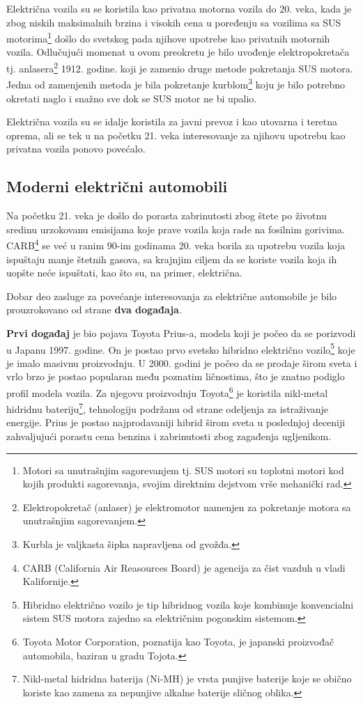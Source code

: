 \documentclass[a4paper]{article}
\begin{document}
Električna vozila su se koristila kao privatna motorna vozila do 20. veka, kada je zbog niskih maksimalnih brzina i visokih cena u poređenju sa vozilima sa SUS motorima\footnote{Motori sa unutrašnjim sagorevanjem tj. SUS motori su toplotni motori kod kojih produkti sagorevanja, svojim direktnim dejstvom vrše mehanički rad.} došlo do svetskog pada njihove upotrebe kao privatnih motornih vozila. Odlučujući momenat u ovom preokretu je bilo uvođenje elektropokretača tj. anlasera\footnote{Elektropokretač (anlaser) je elektromotor namenjen za pokretanje motora sa unutrašnjim sagorevanjem.} 1912. godine. koji je zamenio druge metode pokretanja SUS motora. Jedna od zamenjenih metoda je bila pokretanje kurblom\footnote{Kurbla je valjkasta šipka napravljena od gvožđa.} koju je bilo potrebno okretati naglo i snažno sve dok se SUS motor ne bi upalio.

Električna vozila su se idalje koristila za javni prevoz i kao utovarna i teretna oprema, ali se tek u na početku 21. veka interesovanje za njihovu upotrebu kao privatna vozila ponovo povećalo.


\subsection{Moderni električni automobili}
\label{subsec:podnaslov2}


Na početku 21. veka je došlo do porasta zabrinutosti zbog štete po životnu sredinu urzokovanu emisijama koje prave vozila koja rade na fosilnim gorivima. CARB\footnote{CARB (California Air Reasources Board) je agencija za čist vazduh u vladi Kalifornije.} se već u ranim 90-im godinama 20. veka borila za upotrebu vozila koja ispuštaju manje štetnih gasova, sa krajnjim ciljem da se koriste vozila koja ih uopšte neće ispuštati, kao što su, na primer, električna.

Dobar deo zasluge za povećanje interesovanja za električne automobile je bilo prouzrokovano od strane \textbf{dva događaja}.

\textbf{Prvi događaj} je bio pojava Toyota Prius-a, modela koji je počeo da se porizvodi u Japanu 1997. godine. On je postao prvo svetsko hibridno električno vozilo\footnote{Hibridno električno vozilo je tip hibridnog vozila koje kombinuje konvencialni sistem SUS motora zajedno sa električnim pogonskim sistemom.} koje je imalo masivnu proizvodnju. U 2000. godini je počeo da se prodaje širom sveta i vrlo brzo je postao popularan među poznatim ličnostima, što je znatno podiglo profil modela vozila. Za njegovu proizvodnju Toyota\footnote{Toyota Motor Corporation, poznatija kao Toyota, je japanski proizvođač automobila, baziran u gradu Tojota.} je koristila nikl-metal hidridnu bateriju\footnote{Nikl-metal hidridna baterija (Ni-MH) je vrsta punjive baterije koje se obično koriste kao zamena za nepunjive alkalne baterije sličnog oblika.}, tehnologiju podržanu od strane odeljenja za istraživanje energije. Prius je postao najprodavaniji hibrid širom sveta u poslednjoj deceniji zahvaljujući porastu cena benzina i zabrinutosti zbog zagađenja ugljenikom.
\end{document}
